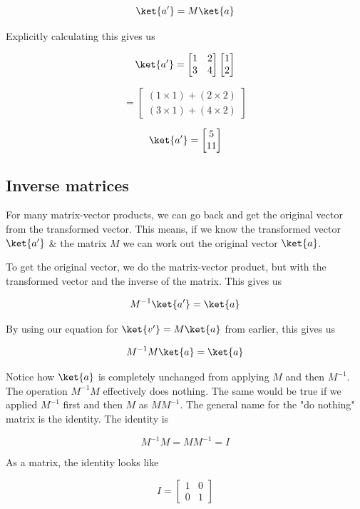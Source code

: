 \documentclass{book}
\begin{document}
$$
\ket{a'} = M\ket{a}
$$

Explicitly calculating this gives us

$$
\ket{a'} =  \begin{bmatrix} 1 & 2  \\ 3 & 4 \end{bmatrix} \begin{bmatrix} 1 \\ 2 \end{bmatrix}
$$

$$
= \begin{bmatrix} (1 \times 1) + (2 \times 2) \\ (3 \times 1) + (4 \times 2) \end{bmatrix}
$$

$$
\ket{a'} = \begin{bmatrix} 5 \\ 11 \end{bmatrix}
$$

\subsection{ Inverse matrices }

For many matrix-vector products, we can go back and get the original vector from the transformed vector. This means, if we know the transformed vector $\ket{a'}$ \&  the matrix $M$ we can work out the original vector $\ket{a}$. 

To get the original vector, we do the matrix-vector product, but with the transformed vector and the inverse of the matrix. This gives us 

$$
M^{-1}\ket{a'} = \ket{a}
$$

By using our equation for $\ket{v'} = M\ket{a}$ from earlier, this gives us 

$$
M^{-1}M\ket{a} = \ket{a}
$$

Notice how $\ket{a}$ is completely unchanged from applying $M$ and then $M^{-1}$. The operation $M^{-1}M$ effectively does nothing. The same would be true if we applied $M^{-1}$ first and then $M$ as $MM^{-1}$. The general name for the "do nothing" matrix is the identity. The identity is

$$M^{-1}M = MM^{-1} = I $$

As a matrix, the identity looks like 

$$ 
I = \begin{bmatrix} 1 & 0 \\ 0 & 1 \end{bmatrix}
$$
\end{document}
